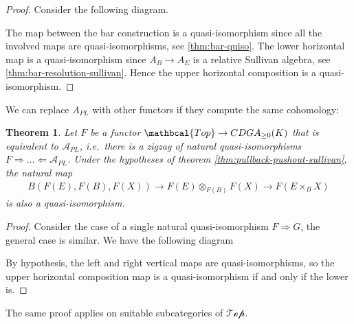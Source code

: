 \documentclass{scrartcl}
\theoremstyle{plain}
\newtheorem{theorem}{Theorem}[section]
\theoremstyle{definition}
\newcommand{\cat}[1]{\mathbcal{#1}}
\newcommand{\Apl}{\mathcal A_{PL}}
\newcommand{\nto}{\Rightarrow}
\newcommand{\nfrom}{\Leftarrow}
\begin{document}
\begin{proof}
    Consider the following diagram.
    \begin{center}
    \end{center}
    The map between the bar construction is a quasi-isomorphism since all the involved maps are quasi-isomorphisms, see \ref{thm:bar-quiso}. The lower horizontal map is a quasi-isomorphism since $A_B\to A_E$ is a relative Sullivan algebra, see \ref{thm:bar-resolution-sullivan}. Hence the upper horizontal composition is a quasi-isomorphism.
\end{proof}

We can replace $A_{PL}$ with other functors if they compute the same cohomology:
\begin{theorem}
    Let $F$ be a functor $\cat{Top}\to CDGA_{\geq 0}(K)$ that is equivalent to $\Apl$, i.e.\ there is a zigzag of natural quasi-isomorphisms $F \nto \dots \nfrom \Apl$. Under the hypotheses of theorem \ref{thm:pullback-pushout-sullivan}, the natural map 
    \begin{align*}
        B(F(E), F(B), F(X)) \to F(E)\otimes_{F(B)} F(X) \to F(E\times_B X)
    \end{align*}
    is also a quasi-isomorphism.
\end{theorem}
\begin{proof}
    Consider the case of a single natural quasi-isomorphism $F \nto G$, the general case is similar. We have the following diagram
    \begin{center}
    \end{center}
    By hypothesis, the left and right vertical maps are quasi-isomorphisms, so the upper horizontal composition map is a quasi-isomorphism if and only if the lower is.
\end{proof}
The same proof applies on suitable subcategories of $\mathcal{Top}$.
\end{document}
